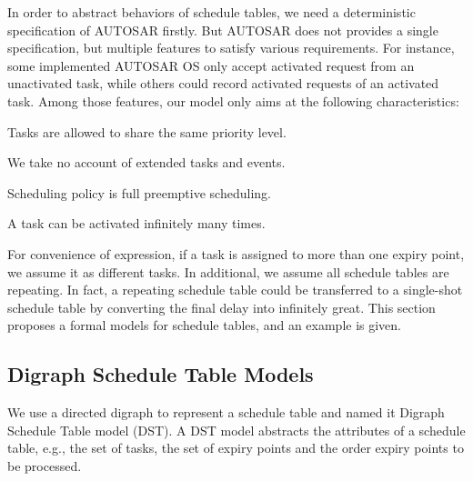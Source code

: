\documentclass[10pt,conference]{IEEEtran}
\begin{document}
In order to abstract behaviors of schedule tables, we need a deterministic specification of AUTOSAR firstly. But AUTOSAR does not provides a single specification, but multiple features to satisfy various requirements. For instance, some implemented AUTOSAR OS only accept activated request from an unactivated task, while others could record activated requests of an activated task. Among those features, our model only aims at the following characteristics: 
\begin{compactitem}
  \item Tasks are allowed to share the same priority level.
  \item We take no account of extended tasks and events.
  \item Scheduling policy is full preemptive scheduling.
  \item A task can be activated infinitely many times.
\end{compactitem}

For convenience of expression, if a task is assigned to more than one expiry point, we assume it as different tasks. In additional, we assume all schedule tables are repeating. In fact, a repeating schedule table could be transferred to a single-shot schedule table by converting the final delay into infinitely great. This section proposes a formal models for schedule tables, and an example is given.

\subsection{Digraph Schedule Table Models}
We use a directed digraph to represent a schedule table and named it Digraph Schedule Table model (DST). A DST model abstracts the attributes of a schedule table, e.g., the set of tasks, the set of expiry points and the order expiry points to be processed.
\end{document}
